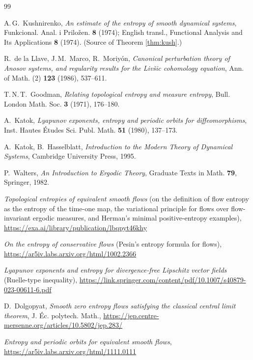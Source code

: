 \documentclass[11pt]{amsart}
\theoremstyle{plain}
\theoremstyle{definition}
\theoremstyle{remark}
\begin{document}
\begin{thebibliography}{99}

 A.\,G.~Kushnirenko, \emph{An estimate of the entropy of
smooth dynamical systems}, Funkcional. Anal. i Prilo\v{z}en. \textbf{8}
(1974); English transl., Functional Analysis and Its Applications
\textbf{8} (1974). (Source of Theorem \ref{thm:kush}.)

 R.~de la Llave, J.\,M.~Marco, R.~Moriy\'on,
\emph{Canonical perturbation theory of Anosov systems, and regularity
results for the Liv\v{s}ic cohomology equation}, Ann. of Math. (2)
\textbf{123} (1986), 537--611.

 T.\,N.\,T.~Goodman, \emph{Relating topological entropy and
measure entropy}, Bull. London Math. Soc. \textbf{3} (1971), 176--180.

 A.~Katok, \emph{Lyapunov exponents, entropy and periodic
orbits for diffeomorphisms}, Inst. Hautes \'Etudes Sci. Publ. Math.
\textbf{51} (1980), 137--173.

 A.~Katok, B.~Hasselblatt, \emph{Introduction to the Modern
Theory of Dynamical Systems}, Cambridge University Press, 1995.

 P.~Walters, \emph{An Introduction to Ergodic Theory},
Graduate Texts in Math. \textbf{79}, Springer, 1982.

 \emph{Topological entropies of equivalent smooth flows}
(on the definition of flow entropy as the entropy of the time-one map,
the variational principle for flows over flow-invariant ergodic
measures, and Herman's minimal positive-entropy examples),
\url{https://exa.ai/library/publication/lbqpyt46khy}

 \emph{On the entropy of conservative flows} (Pesin's
entropy formula for flows),
\url{https://ar5iv.labs.arxiv.org/html/1002.2366}

 \emph{Lyapunov exponents and entropy for divergence-free
Lipschitz vector fields} (Ruelle-type inequality),
\url{https://link.springer.com/content/pdf/10.1007/s40879-023-00611-6.pdf}

 D.~Dolgopyat, \emph{Smooth zero entropy flows
satisfying the classical central limit theorem},
J. \'Ec. polytech. Math., \url{https://jep.centre-mersenne.org/articles/10.5802/jep.283/}

 \emph{Entropy and periodic orbits for equivalent smooth
flows}, \url{https://ar5iv.labs.arxiv.org/html/1111.0111}

\end{thebibliography}
\end{document}
